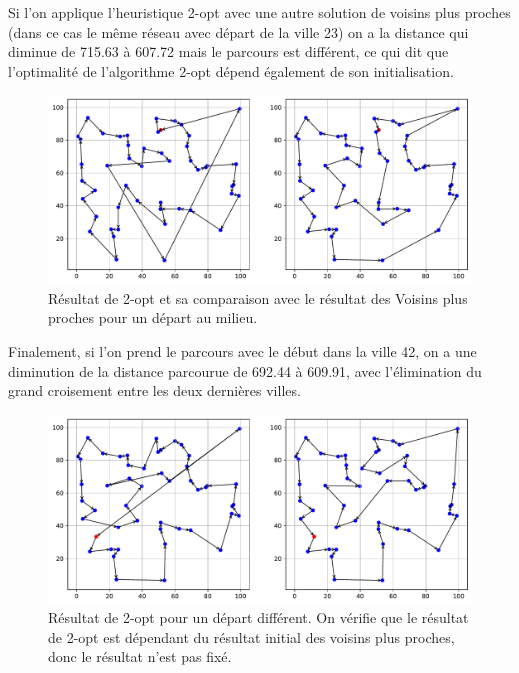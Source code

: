 \documentclass[a4paper,11pt,fleqn]{article}
\begin{document}
Si l'on applique l'heuristique 2-opt avec une autre solution de voisins plus proches (dans ce cas le même réseau avec départ de la ville 23) on a la distance qui diminue de 715.63 à 607.72 mais le parcours est différent, ce qui dit que l'optimalité de l'algorithme 2-opt dépend également de son initialisation.

\begin{figure}[H]
    \centering
    \includegraphics[width=\textwidth]{images/2opt_50_villes_depart_23.pdf}
    \caption{Résultat de 2-opt et sa comparaison avec le résultat des Voisins plus proches pour un départ au milieu.}
    \label{fig:2opt-dep23}
\end{figure}

Finalement, si l'on prend le parcours avec le début dans la ville 42, on a une diminution de la distance parcourue de 692.44 à 609.91, avec l'élimination du grand croisement entre les deux dernières villes.

\begin{figure}[H]
    \centering
    \includegraphics[width=\textwidth]{images/2opt_50_villes_depart_42.pdf}
    \caption{Résultat de 2-opt pour un départ différent. On vérifie que le résultat de 2-opt est dépendant du résultat initial des voisins plus proches, donc le résultat n'est pas fixé.}
    \label{fig:2opt-dep42}
\end{figure}
\end{document}
